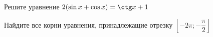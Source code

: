 \begin{ex}
	\begin{condition}
		\begin{enumcols}[label=\asbuk*)]
			\item Решите уравнение \( 2  (\sin x +\cos x)  = \ctg x + 1 \)
			\item Найдите все корни уравнения, принадлежащие отрезку \( \left[-2\pi;-\dfrac{\pi}{2}\right] \)
		\end{enumcols}
	\end{condition}
\end{ex}